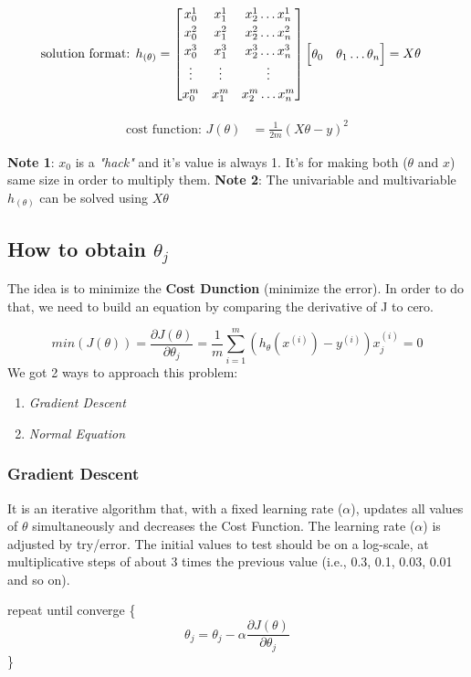 \begin{align}
	\text{solution format: } h_{(\theta)} & = 
	\renewcommand\arraystretch{1.2}\begin{bmatrix}
			x_0^1 & x_1^1 & x_2^1 \hdots x_n^1 \\
			x_0^2 & x_1^2 & x_2^2 \hdots x_n^2 \\
			x_0^3 & x_1^3 & x_2^3 \hdots x_n^3 \\
			\vdots & \vdots & \vdots \\
			x_0^m & x_1^m & x_2^m \hdots x_n^m \\
		\end{bmatrix}
	\begin{bmatrix} \theta_0 & \theta_1 \hdots \theta_n \end{bmatrix} = X\theta
\end{align}

\begin{align}
	\text{cost function: } J(\theta) & = \frac{1}{2m}(X\theta - y)^2
\end{align}

\justify
\textbf{Note 1}: $x_0$ is a \textit{"hack"} and it's value is always 1. It's for making both ($\theta$ and $x$) same size in order to multiply them.
\justify
\textbf{Note 2}: The univariable and multivariable $h_{(\theta)}$ can be solved using $X\theta$


\subsection{How to obtain $\theta_{j}$}
The idea is to minimize the \textbf{Cost Dunction} (minimize the error). In order to do that, we need to build an equation by comparing the derivative of J to cero.

$$min(J(\theta)) = \frac{\partial{J(\theta)}}{\partial{\theta_{j}}} = \frac{1}{m}\sum_{i=1}^{m} (h_{\theta}(x^{(i)}) - y^{(i)})x_{j}^{(i)} = 0$$
We got 2 ways to approach this problem:

\begin{enumerate}[label=\arabic*.]
\item \textit{Gradient Descent}
\item \textit{Normal Equation}
\end{enumerate}

\subsubsection{Gradient Descent}
It is an iterative algorithm that, with a fixed learning rate ($\alpha$), updates all values of $\theta$ simultaneously and decreases the Cost Function.
The learning rate ($\alpha$) is adjusted by try/error. The initial values to test should be on a log-scale, at multiplicative
steps of about 3 times the previous value (i.e., 0.3, 0.1, 0.03, 0.01 and so on).
\par
\begin{center}
repeat until converge \{
	$$\theta_{j} = \theta_{j} - \alpha \frac{\partial{J(\theta)}}{\partial{\theta_j}}$$
\}
\end{center}

